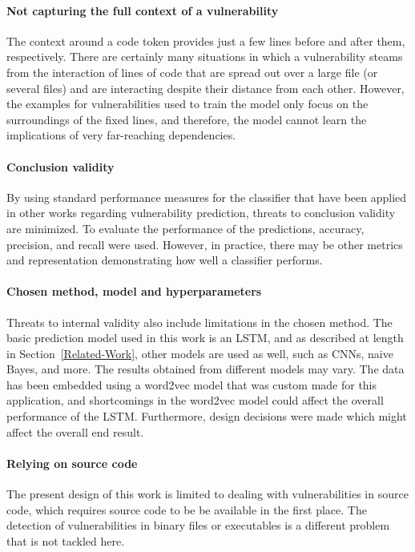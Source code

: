 \documentclass[
a4paper,
pagesize,
pdftex,
12pt,
ngerman,
fleqn,
final,
]{scrartcl}
\begin{document}
	\paragraph{Not capturing the full context of a vulnerability}
	The context around a code token provides just a few lines before and after them, respectively. There are certainly many situations in which a vulnerability steams from the interaction of lines of code that are spread out over a large file (or several files) and are interacting despite their distance from each other. However, the examples for vulnerabilities used to train the model only focus on the surroundings of the fixed lines, and therefore, the model cannot learn the implications of very far-reaching dependencies.\\
	\paragraph{Conclusion validity}
	By using standard performance measures for the classifier that have been applied in other works regarding vulnerability prediction, threats to conclusion validity are minimized. To evaluate the performance of the predictions, accuracy, precision, and recall were used. However, in practice, there may be other metrics and representation demonstrating how well a classifier performs.
	\paragraph{Chosen method, model and hyperparameters}
	Threats to internal validity also include limitations in the chosen method. The basic prediction model used in this work is an LSTM, and as described at length in Section~\ref{Related-Work}, other models are used as well, such as CNNs, naive Bayes, and more. The results obtained from different models may vary. The data has been embedded using a word2vec model that was custom made for this application, and shortcomings in the word2vec model could affect the overall performance of the LSTM. Furthermore, design decisions were made which might affect the overall end result.  
	\paragraph{Relying on source code}
	The present design of this work is limited to dealing with vulnerabilities in source code, which requires source code to be be available in the first place. The detection of vulnerabilities in binary files or executables is a different problem that is not tackled here. 
\end{document}
